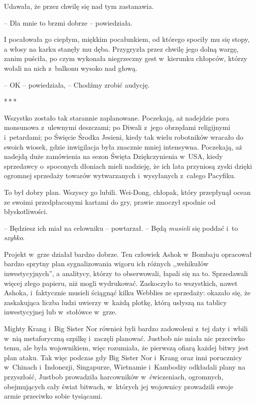 \documentclass[oneside,polish,11pt,rmheadings]{mwbk}
\newcommand{\threeast}{\par\centerline{*\,*\,*}\medskip\par}
\begin{document}
Udawała, że przez chwilę się nad tym zastanawia. 

-- Dla mnie to brzmi dobrze -- powiedziała.

 I pocałowała go ciepłym, miękkim pocałunkiem, od którego spociły mu się stopy, a włosy na karku stanęły mu dęba. Przygryzła przez chwilę jego dolną wargę, zanim puściła, po czym wykonała niegrzeczny gest w~kierunku chłopców, którzy wołali na nich z~balkonu wysoko nad głową.

-- OK -- powiedziała, -- Chodźmy zrobić audycję.

\bigskip
\threeast

Wszystko zostało tak starannie zaplanowane. Poczekają, aż nadejdzie pora monsunowa z~ulewnymi deszczami; po Diwali z~jego obrzędami religijnymi i~petardami; po Święcie Środka Jesieni, kiedy tak wielu robotników wracało do swoich wiosek, gdzie inwigilacja była znacznie mniej intensywna. Poczekają, aż nadejdą duże zamówienia na sezon Święta Dziękczynienia w~USA, kiedy sprzedawcy o~spoconych dłoniach mieli nadzieję, że ich lata przyniosą zyski dzięki ogromnej sprzedaży towarów wytwarzanych i~wysyłanych z~całego Pacyfiku.

To był dobry plan. Wszyscy go lubili. Wei-Dong, chłopak, który przepłynął ocean ze swoimi przedpłaconymi kartami do gry, prawie zmoczył spodnie od błyskotliwości. 

-- Będziesz ich miał na celowniku -- powtarzał. -- Będą \textit{musieli }się poddać i~to \textit{szybko}.

Projekt w~grze działał bardzo dobrze. Ten człowiek Ashok w~Bombaju opracował bardzo sprytny plan sygnalizowania wigoru ich różnych ,,wehikułów inwestycyjnych'', a analitycy, którzy to obserwowali, łapali się na to. Sprzedawali więcej złego papieru, niż mogli wydrukować. Zaskoczyło to wszystkich, nawet Ashoka, i~faktycznie musieli ściągnąć kilku Webblies ze sprzedaży: okazało się, że zaskakująca liczba ludzi uwierzy w~każdą plotkę, którą usłyszą na tablicy inwestycyjnej lub w~stołówce w~grze.

Mighty Krang i~Big Sister Nor również byli bardzo zadowoleni z~tej daty i~wbili w~nią metaforyczną szpilkę i~zaczęli planować. Justbob nie miała nic przeciwko temu, ale była wojownikiem, więc rozumiała, że pierwszą ofiarą każdej bitwy jest plan ataku. Tak więc podczas gdy Big Sister Nor i~Krang oraz inni porucznicy w~Chinach i~Indonezji, Singapurze, Wietnamie i~Kambodży odkładali plany na przyszłość, Justbob prowadziła harcowników w~ćwiczeniach, ogromnych, obejmujących cały świat bitwach, w~których jej wojownicy prowadzili swoje armie przeciwko sobie tysiącami.
\end{document}
